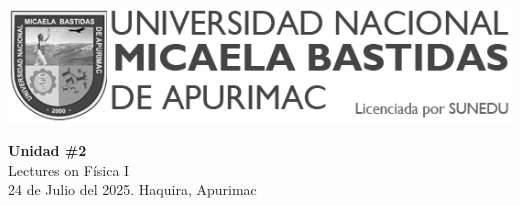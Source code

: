 


\begin{minipage}[l]{0.42\textwidth}
    \includegraphics[width=1\textwidth]{img/logo-UNAMBA.png}
\end{minipage}
\hfill
\begin{minipage}[c]{0.5\textwidth}
    \begin{flushright}
	\large{\textbf{Unidad \#2}}\\
	\large{Lectures on Física I}\\
	\large{24 de Julio del 2025. Haquira, Apurimac}\\
    \end{flushright}
\end{minipage}


  
